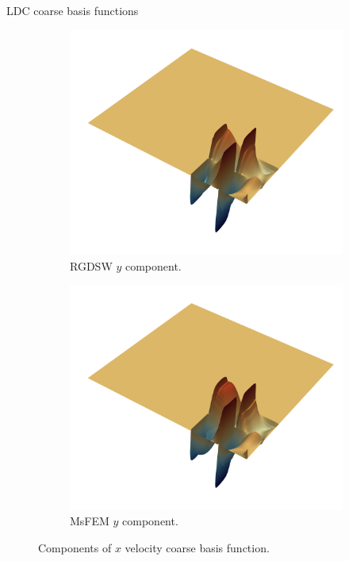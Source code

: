 \begin{frame}[noframenumbering]{LDC coarse basis functions}
	\begin{figure}
		\centering
		\begin{subfigure}{0.5\textwidth}
			\includegraphics[width=\textwidth]{images/RGDSW-y}
			\caption{RGDSW $y$ component.}
		\end{subfigure}%
		\begin{subfigure}{0.5\textwidth}
			\includegraphics[width=\textwidth]{images/MsFEM-y}
			\caption{MsFEM $y$ component.}
		\end{subfigure}
		\caption{Components of $x$ velocity coarse basis function.}
	\end{figure}
\end{frame}
